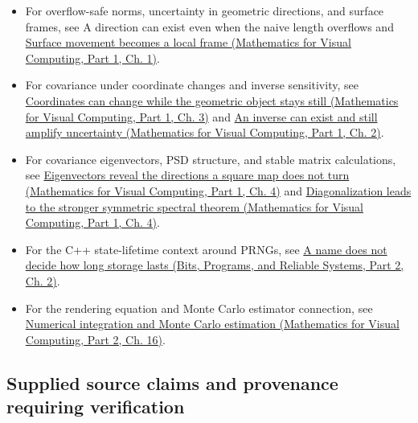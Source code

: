 \begin{itemize}
\tightlist
\item
  For overflow-safe norms, uncertainty in geometric directions, and surface frames, see {A direction can exist even when the naive length overflows} and \href{../02-Mathematics-for-Visual-Computing-P01/main.pdf\#01-foundations-i-ch017-surface-movement-becomes-a-local-frame}{Surface movement becomes a local frame (Mathematics for Visual Computing, Part 1, Ch. 1)}.
\item
  For covariance under coordinate changes and inverse sensitivity, see \href{../02-Mathematics-for-Visual-Computing-P01/main.pdf\#01-foundations-i-ch019-coordinates-can-change-while-the-geometric-object-stays-still}{Coordinates can change while the geometric object stays still (Mathematics for Visual Computing, Part 1, Ch. 3)} and \href{../02-Mathematics-for-Visual-Computing-P01/main.pdf\#01-foundations-i-ch018-an-inverse-can-exist-and-still-amplify-uncertainty}{An inverse can exist and still amplify uncertainty (Mathematics for Visual Computing, Part 1, Ch. 2)}.
\item
  For covariance eigenvectors, PSD structure, and stable matrix calculations, see \href{../02-Mathematics-for-Visual-Computing-P01/main.pdf\#01-foundations-i-ch020-eigenvectors-reveal-the-directions-a-square-map-does-not-turn}{Eigenvectors reveal the directions a square map does not turn (Mathematics for Visual Computing, Part 1, Ch. 4)} and \href{../02-Mathematics-for-Visual-Computing-P01/main.pdf\#01-foundations-i-ch020-diagonalization-leads-to-the-stronger-symmetric-spectral-theorem}{Diagonalization leads to the stronger symmetric spectral theorem (Mathematics for Visual Computing, Part 1, Ch. 4)}.
\item
  For the C++ state-lifetime context around PRNGs, see \href{../01-Bits-Programs-and-Reliable-Systems-P02/main.pdf\#01-foundations-i-ch002-a-name-does-not-decide-how-long-storage-lasts}{A name does not decide how long storage lasts (Bits, Programs, and Reliable Systems, Part 2, Ch. 2)}.
\item
  For the rendering equation and Monte Carlo estimator connection, see \href{../02-Mathematics-for-Visual-Computing-P02/main.pdf\#03-visual-computing-i-ch012-numerical-integration-and-monte-carlo-estimation}{Numerical integration and Monte Carlo estimation (Mathematics for Visual Computing, Part 2, Ch. 16)}.
\end{itemize}

\subsection{Supplied source claims and provenance requiring verification}\label{02-foundations-ii-ch039-supplied-source-claims-and-provenance-requiring-verification}

